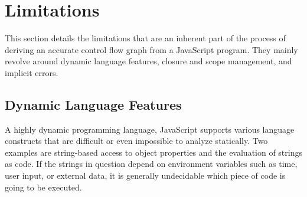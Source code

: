 \section{Limitations}
\label{sec:limitations}

This section details the limitations that are an inherent part of the process of deriving an accurate control flow graph from a JavaScript program. They mainly revolve around dynamic language features, closure and scope management, and implicit errors.

\subsection{Dynamic Language Features}

A highly dynamic programming language, JavaScript supports various language constructs that are difficult or even impossible to analyze statically. Two examples are string-based access to object properties and the evaluation of strings as code. If the strings in question depend on environment variables such as time, user input, or external data, it is generally undecidable which piece of code is going to be executed.






